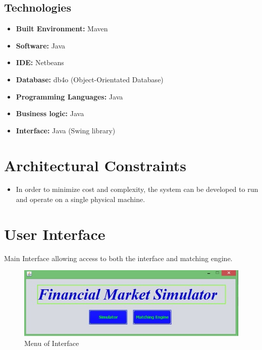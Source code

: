 \documentclass[12pt]{article}
\begin{document}
                \subsection{Technologies}
                    \begin{itemize}
                        \item \textbf{Built Environment:} Maven
                        \item \textbf{Software:} Java
                        \item \textbf{IDE:} Netbeans
                        \item \textbf{Database:} db4o (Object-Orientated Database)
                        \item \textbf{Programming Languages:} Java
                        \item \textbf{Business logic:} Java
                        \item \textbf{Interface:} Java (Swing library)
                    \end{itemize}

		\section{Architectural Constraints}
		\begin{itemize}
		\item In order to minimize cost and complexity, the system can be developed to run and operate on a single physical machine. 
		\end{itemize}

        \newpage
	\section{User Interface}
           Main Interface allowing access to both the interface and matching engine.
            
            \begin{figure}[th]
             \centering
             \includegraphics[scale=0.8]{maininterface}
             \caption{Menu of Interface}
             \label{Main Interface}
            \end{figure}
            
\end{document}
